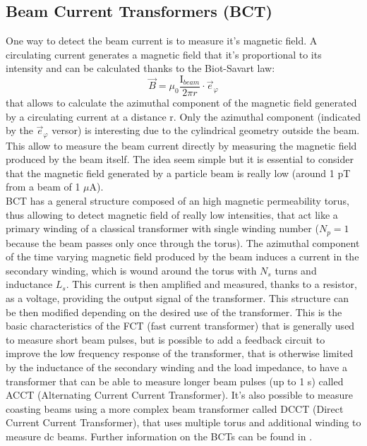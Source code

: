 \documentclass[12pt,a4paper]{report}
\begin{document}
	\subsection{Beam Current Transformers (BCT)}
	One way to detect the beam current is to measure it's magnetic field. A circulating current generates a magnetic field that it's proportional to its intensity and can be calculated thanks to the Biot-Savart law:
	\begin{equation}
		\overrightarrow{B} = \mu_0 \frac{\text{I}_{beam}}{2\pi r} \cdot \overrightarrow{e}_{\varphi}
		\label{Biot-Savart}
	\end{equation}
	that allows to calculate the azimuthal component of the magnetic field generated by a circulating current at a distance r. Only the azimuthal component (indicated by the $\overrightarrow{e}_{\varphi}$ versor) is interesting due to the cylindrical geometry outside the beam.
	This allow to measure the beam current directly by measuring the magnetic field produced by the beam itself. The idea seem simple but it is essential to consider that the magnetic field generated by a particle beam is really low (around 1 pT from a beam of 1 $\mu$A). \\
	BCT has a general structure composed of an high magnetic permeability torus, thus allowing to detect magnetic field of really low intensities, that act like a primary winding of a classical transformer with single winding number ($N_p = 1$ because the beam passes only once through the torus). The azimuthal component of the time varying magnetic field produced by the beam induces a current in the secondary winding, which is wound around the torus with $N_s$ turns and inductance $L_s$. This current is then amplified and measured, thanks to a resistor, as a voltage, providing the output signal of the transformer. This structure can be then modified depending on the desired use of the transformer. This is the basic characteristics of the FCT (fast current transformer) that is generally used to measure short beam pulses, but is possible to add a feedback circuit to improve the low frequency response of the transformer, that is otherwise limited by the inductance of the secondary winding and the load impedance, to have a transformer that can be able to measure longer beam pulses (up to 1 s) called ACCT (Alternating Current Current Transformer). It's also possible to measure coasting beams using a more complex beam transformer called DCCT (Direct Current Current Transformer), that uses multiple torus and additional winding to measure dc beams. Further information on the BCTs can be found in \cite{Fork}. \\
\end{document}
